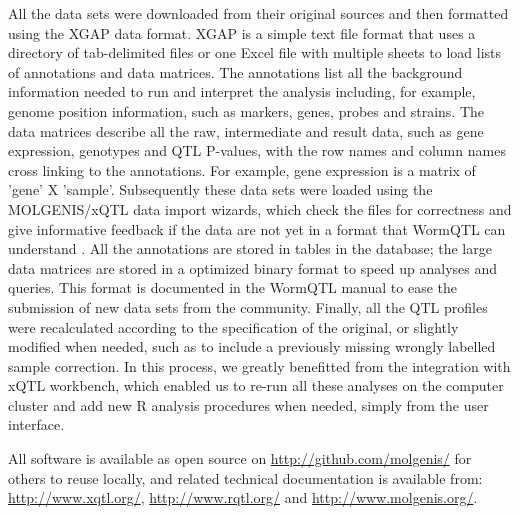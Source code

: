 All the data sets were downloaded from their original sources and then formatted using the 
XGAP data format. XGAP is a simple text file format that uses a directory of tab-delimited 
files or one Excel file with multiple sheets to load lists of annotations and data matrices. 
The annotations list all the background information needed to run and interpret the analysis 
including, for example, genome position information, such as markers, genes, probes and 
strains. The data matrices describe all the raw, intermediate and result data, such as gene 
expression, genotypes and QTL P-values, with the row names and column names cross linking to 
the annotations. For example, gene expression is a matrix of 'gene' X 'sample'. Subsequently 
these data sets were loaded using the MOLGENIS/xQTL data import wizards, which check the 
files for correctness and give informative feedback if the data are not yet in a format that 
WormQTL can understand \cite{Swertz:2010a}. All the annotations are stored in tables in the database; the 
large data matrices are stored in a optimized binary format to speed up analyses and queries. 
This format is documented in the WormQTL manual to ease the submission of new data sets from 
the community. Finally, all the QTL profiles were recalculated according to the specification 
of the original, or slightly modified when needed, such as to include a previously missing 
wrongly labelled sample correction. In this process, we greatly benefitted from the integration 
with xQTL workbench, which enabled us to re-run all these analyses on the computer cluster 
and add new R analysis procedures when needed, simply from the user interface.

All software is available as open source on \url{http://github.com/molgenis/} for others to reuse 
locally, and related technical documentation is available from:\\ \url{http://www.xqtl.org/}, 
\url{http://www.rqtl.org/} and \url{http://www.molgenis.org/}.

